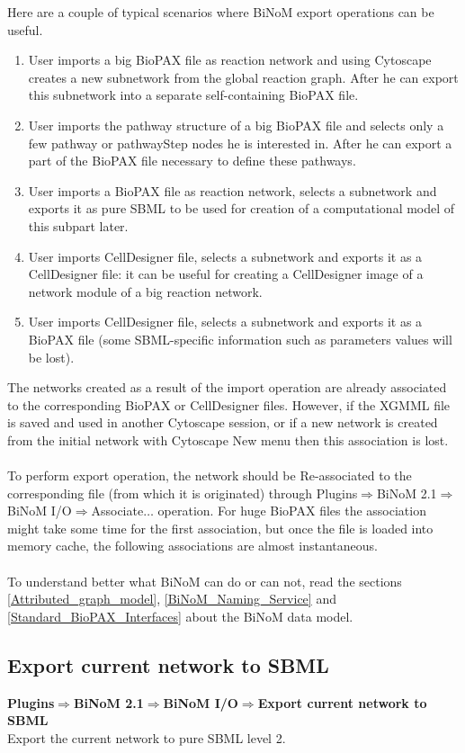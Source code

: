 Here are a couple of typical scenarios where BiNoM export operations can be useful.
\begin{enumerate}
\item User imports a big BioPAX file as reaction network and using Cytoscape creates a new subnetwork from the global reaction graph. After he can export this subnetwork into a separate self-containing BioPAX file.
\item User imports the pathway structure of a big BioPAX file and selects only a few pathway or pathwayStep nodes he is interested in. After he can export a part of the BioPAX file necessary to define these pathways.
\item User imports a BioPAX file as reaction network, selects a subnetwork and exports it as pure SBML to be used for creation of a computational model of this subpart later.
\item User imports CellDesigner file, selects a subnetwork and exports it as a CellDesigner file: it can be useful for creating a CellDesigner image of a network module of a big reaction network.
\item User imports CellDesigner file, selects a subnetwork and exports it as a BioPAX file (some SBML-specific information such as parameters values will be lost).
\end{enumerate}
The networks created as a result of the import operation are already associated to the corresponding BioPAX or CellDesigner files. However, if the XGMML file is saved and used in another Cytoscape session, or if a new network is created from the initial network with Cytoscape New menu then this association is lost.\\\\
To perform export operation, the network should be Re-associated to the corresponding file (from which it is originated) through Plugins$\Rightarrow$BiNoM 2.1$\Rightarrow$BiNoM I/O$\Rightarrow$Associate$\ldots$ operation. For huge BioPAX files the association might take some time for the first association, but once the file is loaded into memory cache, the following associations are almost instantaneous.\\\\
To understand better what BiNoM can do or can not, read the sections \ref{Attributed_graph_model}, \ref{BiNoM_Naming_Service} and \ref{Standard_BioPAX_Interfaces} about the BiNoM data model.

\subsection{Export current network to SBML}
\textbf{Plugins$\Rightarrow$BiNoM 2.1$\Rightarrow$BiNoM I/O$\Rightarrow$Export current network to SBML}\\
Export the current network to pure SBML level 2.

